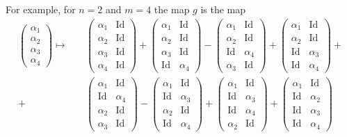 \documentclass[12pt,a4paper,reqno]{amsart}
\DeclareMathOperator{\id}{Id}
\begin{document}
For example, for $n = 2$ and $m = 4$ the map $g$ is
the map 
\begin{align*}
\begin{pmatrix}
\alpha_1
\\
\alpha_2
\\
\alpha_3 
\\
\alpha_4
\end{pmatrix}
\mapsto 
\quad
&
\begin{pmatrix}
\alpha_1 & \id
\\
\alpha_2 & \id
\\
\alpha_3 & \id
\\
\alpha_4 & \id
\end{pmatrix}
+
\begin{pmatrix}
\alpha_1 & \id
\\
\alpha_2 & \id 
\\
\alpha_3 & \id   
\\
\id & \alpha_4 
\end{pmatrix}
-
\begin{pmatrix}
\alpha_1 & \id
\\
\alpha_2 & \id 
\\
\id & \alpha_4 
\\
\alpha_3 & \id  
\end{pmatrix}
+
\begin{pmatrix}
\alpha_1 & \id
\\
\alpha_2 & \id 
\\
\id & \alpha_3 
\\
\id & \alpha_4 
\end{pmatrix}
+
\\
+ 
&\begin{pmatrix}
\alpha_1 & \id
\\
\id & \alpha_4 
\\
\alpha_2 & \id
\\
\alpha_3 & \id
\end{pmatrix}
-
\begin{pmatrix}
\alpha_1 & \id
\\
\id & \alpha_3 
\\
\alpha_2 & \id
\\
\id & \alpha_4
\end{pmatrix}
+
\begin{pmatrix}
\alpha_1 & \id
\\
\id & \alpha_3 
\\
\id & \alpha_4
\\
\alpha_2 & \id
\end{pmatrix}
+
\begin{pmatrix}
\alpha_1 & \id
\\
\id & \alpha_2 
\\
\id & \alpha_3
\\
\id & \alpha_4 
\end{pmatrix}
\end{align*}
\end{document}
